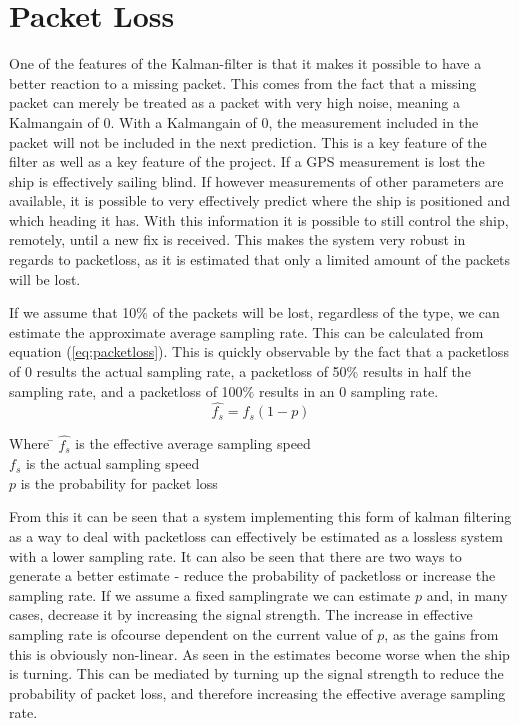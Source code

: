 \chapter{Packet Loss}
\label{chap:PacketLoss}

One of the features of the Kalman-filter is that it makes it possible to have a better reaction to a missing packet. This comes from the fact that a missing packet can merely be treated as a packet with very high noise, meaning a Kalmangain of 0. With a Kalmangain of 0, the measurement included in the packet will not be included in the next prediction. This is a key feature of the filter as well as a key feature of the project.
If a GPS measurement is lost the ship is effectively sailing blind. If however measurements of other parameters are available, it is possible to very effectively predict where the ship is positioned and which heading it has. With this information it is possible to still control the ship, remotely, until a new fix is received. This makes the system very robust in regards to packetloss, as it is estimated that only a limited amount of the packets will be lost. 

If we assume that 10$\%$ of the packets will be lost, regardless of the type, we can estimate the approximate average sampling rate. This can be calculated from equation (\ref{eq:packetloss}). This is quickly observable by the fact that a packetloss of 0 results the actual sampling rate, a packetloss of 50$\%$ results in half the sampling rate, and a packetloss of 100$\%$ results in an 0 sampling rate.
\begin{equation}
\hat{f_s} = f_s(1-p)
\end{equation}
\label{eq:packetloss}
\begin{tabbing}
Where \= $\hat{f_s}$ is the effective average sampling speed\\
\> $f_s$ is the actual sampling speed\\
\> $p$ is the probability for packet loss
\end{tabbing}
From this it can be seen that a system implementing this form of kalman filtering as a way to deal with packetloss can effectively be estimated as a lossless system with a lower sampling rate.
It can also be seen that there are two ways to generate a better estimate - reduce the probability of packetloss or increase the sampling rate.
If we assume a fixed samplingrate we can estimate $p$ and, in many cases, decrease it by increasing the signal strength. The increase in effective sampling rate is ofcourse dependent on the current value of $p$, as the gains from this is obviously non-linear. As seen in  the estimates become worse when the ship is turning. This can be mediated by turning up the signal strength to reduce the probability of packet loss, and therefore increasing the effective average sampling rate. 